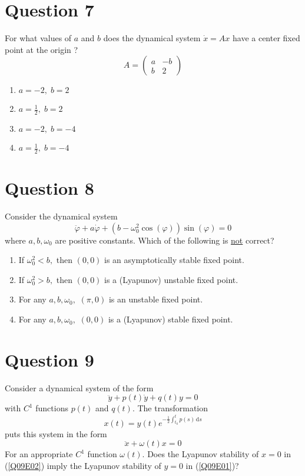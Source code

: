 \documentclass[twoside,10pt,a4paper]{article}
\begin{document}
\section*{Question 7}
For what values of $a$ and $b$ does the dynamical system $\dot{x} = Ax$ have a center fixed point at the origin ?
\begin{equation*}
	A = \begin{pmatrix}
		a & -b \\ b & 2
	\end{pmatrix}
\end{equation*}
\begin{enumerate}[label=(\alph*)]
	\item $\displaystyle a = -2, \; b = 2 $
	\item $\displaystyle a = \frac{1}{2}, \; b = 2 $
	\item $\displaystyle a = -2, \; b = -4 $
	\item $\displaystyle a = \frac{1}{2}, \; b = -4 $
\end{enumerate}

\section*{Question 8}
Consider the dynamical system
\begin{equation*}
	\ddot{\varphi} + a\dot{\varphi} + (b - \omega_0^2 \cos(\varphi))\sin(\varphi) = 0
\end{equation*}
where $a,b,\omega_0$ are positive constants. Which of the following is \underline{not} correct?

\begin{enumerate}[label=(\alph*)]
	\item If $\omega_0^2 < b,$ then $(0,0)$ is an asymptotically stable fixed point.
	\item If $\omega_0^2 > b,$ then $(0,0)$ is a (Lyapunov) unstable fixed point.
	\item For any $a,b,\omega_0,$ $(\pi,0)$ is an unstable fixed point.
	\item For any $a,b,\omega_0,$ $(0,0)$ is a (Lyapunov) stable fixed point. 
\end{enumerate}

\newpage

\section*{Question 9}
Consider a dynamical system of the form
\begin{equation}\label{Q09E01}
	\ddot{y} + p(t)\dot{y} + q(t)y = 0
\end{equation}
with $C^1$ functions $p(t)$ and $q(t)$.
The transformation
\begin{equation*}
	x(t) = y(t)e^{-\frac{1}{2}\int_{t_0}^t p(s)\,\text{d}s}
\end{equation*}
puts this system in the form
\begin{equation}\label{Q09E02}
	\ddot{x} + \omega(t)x = 0
\end{equation}
For an appropriate $C^1$ function $\omega(t)$. Does the Lyapunov stability of $x = 0$ in (\ref{Q09E02}) imply the Lyapunov stability of $y = 0$ in (\ref{Q09E01})?
\end{document}
